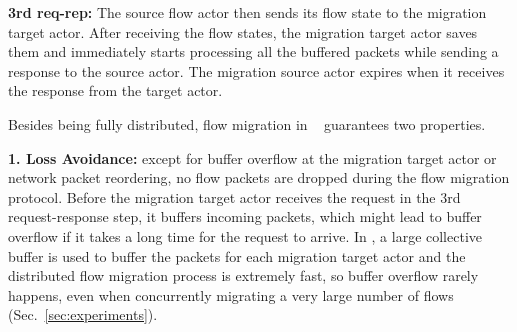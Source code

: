 \textbf{3rd req-rep:} The source flow actor then sends its flow state to the migration target actor. After receiving the flow states, the migration target actor saves them and immediately starts processing all the buffered packets while sending a response to the source actor. The migration source actor expires when it receives the response from the target actor.


Besides being fully distributed, flow migration in \nfactor~ guarantees two properties. %

\textbf{1. Loss Avoidance:} except for buffer overflow at the migration target actor or network packet reordering, no flow packets are dropped during the flow migration protocol. Before the migration target actor receives the request in the 3rd request-response step, it buffers incoming packets, which might lead to buffer overflow if it takes a long time for the request to arrive. %
 In \nfactor, a large collective buffer is used to buffer the packets for each migration target actor and the distributed flow migration process is extremely fast, so buffer overflow rarely happens, even when concurrently migrating a very large number of flows (Sec.~\ref{sec:experiments}).


